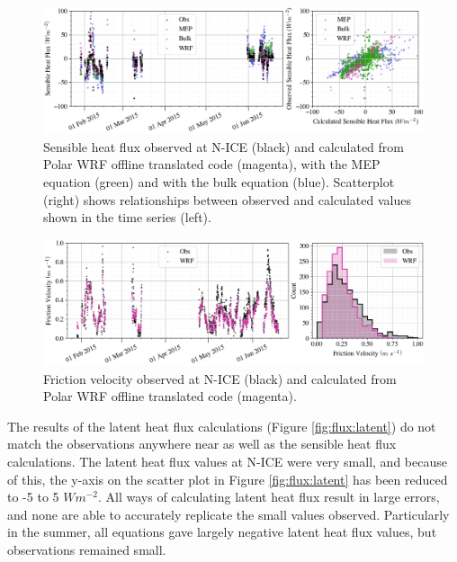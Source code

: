 {\begin{figure}[h]
    \centering
    \includegraphics[width=1\linewidth]{figures/chapter6/sensible_wrf.png}
    \caption[Sensible heat flux observed at N-ICE and calculated from Polar WRF offline translated code.]{Sensible heat flux observed at N-ICE (black) and calculated from Polar WRF offline translated code (magenta), with the MEP equation (green) and with the bulk equation (blue). Scatterplot (right) shows relationships between observed and calculated values shown in the time series (left).}
    \label{fig:flux:sensible}
\end{figure}

\begin{figure}[h]
    \centering
    \includegraphics[width=1\linewidth]{figures/chapter6/ustar_wrf.png}
    \caption[Friction velocity observed at N-ICE and calculated from Polar WRF offline translated code.]{Friction velocity observed at N-ICE (black) and calculated from Polar WRF offline translated code (magenta).}
    \label{fig:flux:ustar}
\end{figure}

The results of the latent heat flux calculations (Figure \ref{fig:flux:latent}) do not match the observations anywhere near as well as the sensible heat flux calculations. The latent heat flux values at N-ICE were very small, and because of this, the y-axis on the scatter plot in Figure \ref{fig:flux:latent} has been reduced to -5 to 5 $Wm^{-2}$. All ways of calculating latent heat flux result in large errors, and none are able to accurately replicate the small values observed. Particularly in the summer, all equations gave largely negative latent heat flux values, but observations remained small.

}
